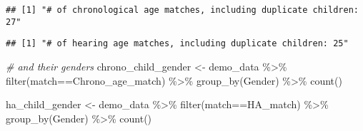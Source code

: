 \documentclass[
]{article}
\newenvironment{Shaded}{\begin{snugshade}}{\end{snugshade}}
\newcommand{\CommentTok}[1]{\textcolor[rgb]{0.56,0.35,0.01}{\textit{#1}}}
\newcommand{\FunctionTok}[1]{\textcolor[rgb]{0.00,0.00,0.00}{#1}}
\newcommand{\NormalTok}[1]{#1}
\newcommand{\OtherTok}[1]{\textcolor[rgb]{0.56,0.35,0.01}{#1}}
\newcommand{\SpecialCharTok}[1]{\textcolor[rgb]{0.00,0.00,0.00}{#1}}
\newcommand{\StringTok}[1]{\textcolor[rgb]{0.31,0.60,0.02}{#1}}
\begin{document}
\begin{verbatim}
## [1] "# of chronological age matches, including duplicate children: 27"
\end{verbatim}

\begin{Shaded}
\end{Shaded}

\begin{verbatim}
## [1] "# of hearing age matches, including duplicate children: 25"
\end{verbatim}

\begin{Shaded}
\begin{Highlighting}[]
\CommentTok{\# and their genders}
\NormalTok{chrono\_child\_gender }\OtherTok{\textless{}{-}}\NormalTok{ demo\_data }\SpecialCharTok{\%\textgreater{}\%}
  \FunctionTok{filter}\NormalTok{(match}\SpecialCharTok{==}\StringTok{\textquotesingle{}Chrono\_age\_match\textquotesingle{}}\NormalTok{) }\SpecialCharTok{\%\textgreater{}\%}
  \FunctionTok{group\_by}\NormalTok{(Gender) }\SpecialCharTok{\%\textgreater{}\%}
  \FunctionTok{count}\NormalTok{()}

\NormalTok{ha\_child\_gender }\OtherTok{\textless{}{-}}\NormalTok{ demo\_data }\SpecialCharTok{\%\textgreater{}\%}
  \FunctionTok{filter}\NormalTok{(match}\SpecialCharTok{==}\StringTok{\textquotesingle{}HA\_match\textquotesingle{}}\NormalTok{) }\SpecialCharTok{\%\textgreater{}\%}
  \FunctionTok{group\_by}\NormalTok{(Gender) }\SpecialCharTok{\%\textgreater{}\%}
  \FunctionTok{count}\NormalTok{()}
\end{Highlighting}
\end{Shaded}
\end{document}
